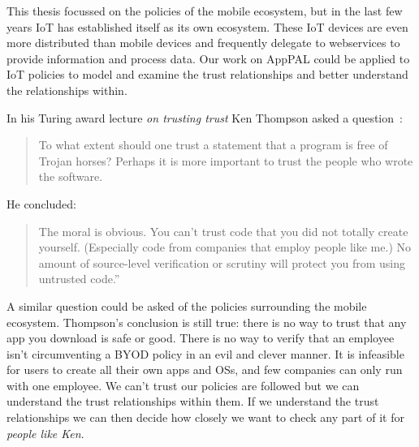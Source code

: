 \documentclass[thesis.tex]{subfiles}
\begin{document}
This thesis focussed on the policies of the mobile ecosystem, but in the last
few years \ac{IoT} has established itself as its own ecosystem. These IoT
devices are even more distributed than mobile devices and frequently delegate to
webservices to provide information and process data. Our work on AppPAL could be
applied to IoT policies to model and examine the trust relationships and better
understand the relationships within.


In his Turing award lecture \emph{on trusting trust} Ken Thompson asked a
question~\cite{ken_thompson_reflections_1984}:
\begin{quotation} 
  To what extent should one trust a statement that a program is free of Trojan
  horses? Perhaps it is more important to trust the people who wrote the
  software.
\end{quotation}

He concluded:

\begin{quotation}
  The moral is obvious. You can't trust code that you did not totally create
  yourself. (Especially code from companies that employ people like me.)
  No amount of source-level verification or scrutiny will protect you from using untrusted code.''
\end{quotation} 

A similar question could be asked of the policies surrounding the mobile
ecosystem. Thompson's conclusion is still true: there is no way to trust that
any app you download is safe or good. There is no way to verify that an employee
isn't circumventing a BYOD policy in an evil and clever manner. It is infeasible
for users to create all their own apps and OSs, and few companies can only run
with one employee. We can't trust our policies are followed but we can
understand the trust relationships within them. If we understand the trust
relationships we can then decide how closely we want to check any part of it for
\emph{people like Ken}.
\end{document}
